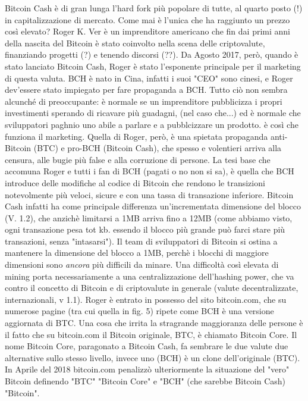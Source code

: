 \documentclass {article}
\begin{document}
{Bitcoin Cash è di gran lunga l'hard fork più popolare di tutte, al quarto posto (!) in capitalizzazione di mercato. Come mai è l'unica che ha raggiunto un prezzo così elevato?
Roger K. Ver è un imprenditore americano che fin dai primi anni della nascita del Bitcoin è stato coinvolto nella scena delle criptovalute, finanziando progetti (?) e tenendo discorsi (??).
Da Agosto 2017, però, quando è stato lanciato Bitcoin Cash, Roger è stato l'esponente principale per il marketing di questa valuta. BCH è nato in Cina, infatti i suoi "CEO" sono cinesi, e Roger dev'essere stato impiegato per fare propaganda a BCH.
Tutto ciò non sembra alcunché di preoccupante: è normale se un imprenditore pubblicizza i propri investimenti sperando di ricavare più guadagni, (nel caso che...) ed è normale che sviluppatori paghnio uno abile a parlare e a pubblcizzare un prodotto.
è così che funziona il marketing.
Quella di Roger, però, è una spietata propaganda anti-Bitcoin (BTC) e pro-BCH (Bitcoin Cash), che spesso e volentieri arriva alla censura, alle bugie più false e alla corruzione di persone.
La tesi base che accomuna Roger e tutti i fan di BCH (pagati o no non si sa), è quella che BCH introduce delle modifiche al codice di Bitcoin che rendono le transizioni notevolmente più veloci, sicure e con una tassa di transazione inferiore. Bitcoin Cash infatti ha come principale differenza un'incrementata dimensione del blocco (V. 1.2), che anzichè limitarsi a 1MB arriva fino a 12MB (come abbiamo visto, ogni transazione pesa tot kb. essendo il blocco più grande può farci stare più transazioni, senza "intasarsi").
Il team di sviluppatori di Bitcoin si ostina a mantenere la dimensione del blocco a 1MB, perchè i blocchi di maggiore dimensioni sono \emph{ancora} più difficili da minare.
Una difficoltà così elevata di mining porta necessariamente a una centralizzazione dell'hashing power, che va contro il concetto di Bitcoin e di criptovalute in generale (valute decentralizzate, internazionali, v 1.1).
Roger è entrato in possesso del sito bitcoin.com, che su numerose pagine (tra cui quella in fig. 5) ripete come BCH è una versione aggiornata di BTC. Una cosa che irrita la stragrande maggioranza delle persone è il fatto che su bitcoin.com il Bitcoin originale, BTC, è chiamato Bitcoin Core.
Il nome Bitcoin Core, paragonato a Bitcoin Cash, fa sembrare le due valute due alternative sullo stesso livello, invece uno (BCH) è un clone dell'originale (BTC).
In Aprile del 2018 bitcoin.com penalizzò ulteriormente la situazione del "vero" Bitcoin definendo "BTC" "Bitcoin Core" e "BCH" (che sarebbe Bitcoin Cash) "Bitcoin".
}
\end{document}
